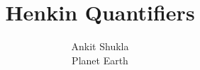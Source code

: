 \documentclass[draft]{llncs}
\begin{document}
\title{Henkin Quantifiers}

\author{
    Ankit Shukla\\
	Planet Earth
}



\maketitle

\begin{abstract}

\end{abstract}

%

%
%

\appendix
\clearpage
\end{document}
